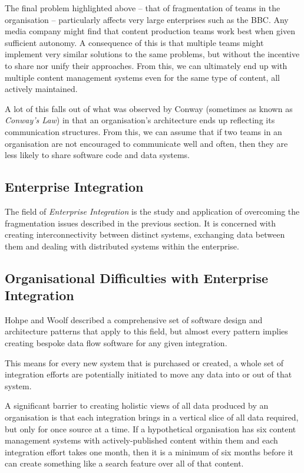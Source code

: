 The final problem highlighted above -- that of fragmentation of teams in the
organisation -- particularly affects very large enterprises such as the BBC.
Any media company might find that content production teams work best when
given sufficient autonomy. A consequence of this is that multiple teams
might implement very similar solutions to the same problems, but without the
incentive to share nor unify their approaches. From this, we can ultimately
end up with multiple content management systems even for the same type of
content, all actively maintained.

A lot of this falls out of what was observed by
Conway\cite{conway1968committees} (sometimes as known as \emph{Conway's Law})
in that an organisation's architecture ends up reflecting its communication
structures. From this, we can assume that if two teams in an organisation
are not encouraged to communicate well and often, then they are less likely to
share software code and data systems.

\subsection{Enterprise Integration}

The field of \emph{Enterprise Integration} is the study and application
of overcoming the fragmentation issues described in the previous
section. It is concerned with creating interconnectivity between
distinct systems, exchanging data between them and dealing with
distributed systems within the enterprise.\cite{vernadat2003enterprise}

\subsection{Organisational Difficulties with Enterprise Integration}
\label{sec:ei-difficulties}

Hohpe and Woolf\cite{hohpe2002enterprise} described a comprehensive
set of software design and architecture patterns that apply to this
field, but almost every pattern implies creating bespoke data flow
software for any given integration.

This means for every new system that is purchased or created, a
whole set of integration efforts are potentially initiated to move any
data into or out of that system.

A significant barrier to creating holistic views of all data
produced by an organisation is that each integration brings in a
vertical slice of all data required, but only for once source at a
time. If a hypothetical organisation has six content management
systems with actively-published content within them and each
integration effort takes one month, then it is a minimum of six
months before it can create something like a search feature over all
of that content.

